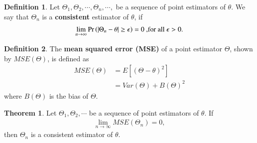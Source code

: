 \documentclass[journal,12pt,twocolumn]{IEEEtran}
\theoremstyle{definition}
\newtheorem{definition}{Definition}[section]
\newtheorem{theorem}{Theorem}[section]
\begin{document}
\begin{definition}
Let $ \Theta_1,\Theta_2, \cdots, \Theta_n , \cdots, $  be a sequence of point estimators of $ \theta $. We say that $ \Theta_n $ is a \textbf{consistent} estimator of $ \theta $, if 
\begin{align}
    \lim_{n\to\infty} \Pr\left(| \Theta_n - \theta | \ge \epsilon\right) = 0 \text{ ,for all $ \epsilon > 0$.}
\end{align}
\end{definition}
\begin{definition}
The \textbf{mean squared error (MSE)} of a point estimator $ \Theta $, shown by $ MSE(\Theta) $, is defined as
\begin{align}
    MSE(\Theta ) &= E[(\Theta - \theta)^2] \\
    &= Var(\Theta) + B(\Theta)^2
\end{align}
where $ B(\Theta ) $ is the bias of $ \Theta $. 
\end{definition}    

\begin{theorem}
 Let $ \Theta_1,\Theta_2 , \cdots$ be a sequence of point estimators of $ \theta $. If
\begin{align}
     \lim_{n\to\infty} MSE( \Theta_n) = 0,
\end{align}
then $ \Theta_n $ is a consistent estimator of $ \theta$.
\end{theorem}
\end{document}
